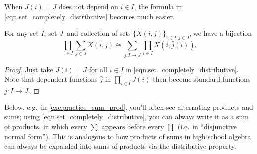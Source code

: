 \documentclass[Book-Poly]{subfiles}
\begin{document}
When $J(i)=J$ does not depend on $i\in I$, the formula in \eqref{eqn.set_completely_distributive} becomes much easier.

\begin{corollary} \label{cor.push_prod_sum_set_indep}
For any set $I$, set $J$, and collection of sets $\{X(i, j)\}_{i \in I, j \in J}$, we have a bijection
\begin{equation} \label{eqn.push_prod_sum_set_indep}
    \prod_{i\in I}\sum_{j\in J}X(i,j)\cong\sum_{\bar{j}\colon I\to J}\prod_{i\in I}X(i,\bar{j}(i)).
\end{equation}
\end{corollary}
\begin{proof}
Just take $J(i) = J$ for all $i \in I$ in \eqref{eqn.set_completely_distributive}.
Note that dependent functions $\bar{j}$ in $\prod_{i \in I} J(i)$ then become standard functions $\bar{j} \colon I \to J$.
\end{proof}

Below, e.g.\ in \cref{exc.practice_sum_prod}, you'll often see alternating products and sums; using \eqref{eqn.set_completely_distributive}, you can always write it as a sum of products, in which every $\sum$ appears before every $\prod$ (i.e.\ in ``disjunctive normal form'').
This is analogous to how products of sums in high school algebra can always be expanded into sums of products via the distributive property.

\end{document}
